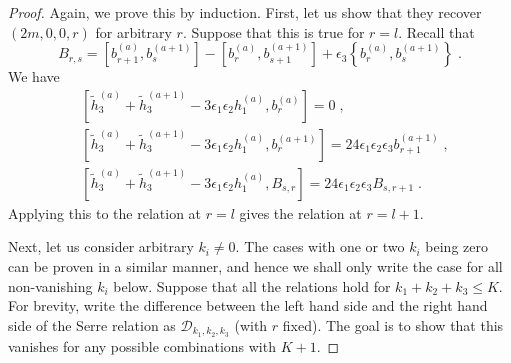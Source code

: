 \documentclass[11pt]{article}
\numberwithin{equation}{section}
\numberwithin{figure}{section}
\numberwithin{table}{section}
\begin{document}
\begin{proof}
	Again, we prove this by induction. First, let us show that they recover $(2m,0,0,r)$ for arbitrary $r$. Suppose that this is true for $r=l$. Recall that
	\begin{equation}
		B_{r,s}=\left[b^{(a)}_{r+1},b^{(a+1)}_s\right]-\left[b^{(a)}_r,b^{(a+1)}_{s+1}\right]+\epsilon_3\left\{b^{(a)}_r,b^{(a+1)}_s\right\}\;.
	\end{equation}
	We have
	\begin{subequations}
		\begin{align}
		&\left[\widetilde{h}^{(a)}_3+\widetilde{h}^{(a+1)}_3-3\epsilon_1\epsilon_2h^{(a)}_1,b^{(a)}_r\right]=0\;,\\
		&\left[\widetilde{h}^{(a)}_3+\widetilde{h}^{(a+1)}_3-3\epsilon_1\epsilon_2h^{(a)}_1,b^{(a+1)}_r\right]=24\epsilon_1\epsilon_2\epsilon_3b^{(a+1)}_{r+1}\;,\\
		&\left[\widetilde{h}^{(a)}_3+\widetilde{h}^{(a+1)}_3-3\epsilon_1\epsilon_2h^{(a)}_1,B_{s,r}\right]=24\epsilon_1\epsilon_2\epsilon_3B_{s,r+1}\;.
	\end{align}
	\end{subequations}
	Applying this to the relation at $r=l$ gives the relation at $r=l+1$.

	Next, let us consider arbitrary $k_i\neq0$. The cases with one or two $k_i$ being zero can be proven in a similar manner, and hence we shall only write the case for all non-vanishing $k_i$ below. Suppose that all the relations hold for $k_1+k_2+k_3\leq K$. For brevity, write the difference between the left hand side and the right hand side of the Serre relation as $\mathcal{D}_{k_1,k_2,k_3}$ (with $r$ fixed). The goal is to show that this vanishes for any possible combinations with $K+1$.


\end{proof}
\end{document}
